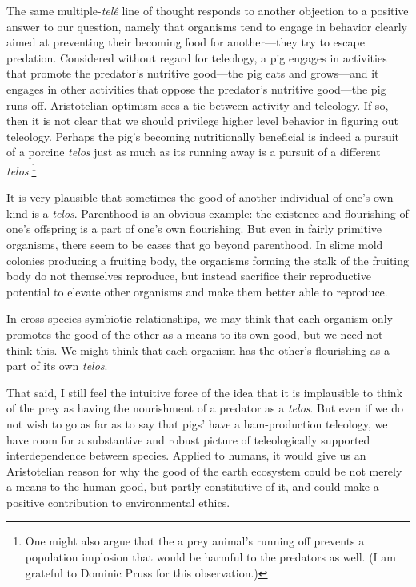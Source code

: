 The same multiple-\textit{tel\^e} line of thought responds to another objection to a positive answer to 
our question, namely that organisms tend to engage in behavior clearly aimed at preventing their becoming
food for another---they try to escape predation. Considered without regard for teleology, a pig engages
in activities that promote the predator's nutritive good---the pig eats and grows---and it engages
in other activities that oppose the predator's nutritive good---the pig runs off. Aristotelian optimism
sees a tie between activity and teleology. If so, then it is not clear that we should privilege higher
level behavior in figuring out teleology. Perhaps the pig's becoming nutritionally beneficial is indeed
a pursuit of a porcine \textit{telos} just as much as its running away is a pursuit of a different
\textit{telos}.\footnote{One might also argue that the a prey animal's running off prevents a population
implosion that would be harmful to the predators as well. (I am grateful to Dominic Pruss for this 
observation.)}

It is very plausible that sometimes the good of another individual of one's own kind is a \textit{telos}.
Parenthood is an obvious example: the existence and flourishing of one's offspring is a part of one's
own flourishing. But even in fairly primitive organisms, there seem to be cases that go beyond parenthood.
In slime mold colonies producing a fruiting body, the organisms forming the stalk of the fruiting body do
not themselves reproduce, but instead sacrifice their reproductive potential to elevate other organisms
and make them better able to reproduce. 

In cross-species symbiotic relationships, we may think that each organism only promotes the good of the 
other as a means to its own good, but we need not think this. We might think that each organism has the
other's flourishing as a part of its own \textit{telos}. 

That said, I still feel the intuitive force of the idea that it is implausible to think of the prey as having the
nourishment of a predator as a \textit{telos}. But even if we do not wish to go as far as to say that pigs'
have a ham-production teleology, we have room for a substantive and robust picture of teleologically supported
interdependence between species. Applied to humans, it would give us an Aristotelian reason for why the good of the earth ecosystem 
could be not merely a means to the human good, but partly constitutive of it, and could make a positive
contribution to environmental ethics. 

